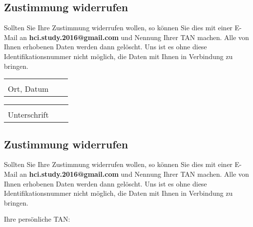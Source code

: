 \documentclass[10pt,a4paper]{scrartcl}
\begin{document}
\subsection*{Zustimmung widerrufen}
Sollten Sie Ihre Zustimmung widerrufen wollen, so können Sie dies mit einer E-Mail an \textbf{hci.study.2016@gmail.com} und Nennung Ihrer TAN machen. Alle von Ihnen erhobenen Daten werden dann gelöscht. Uns ist es ohne diese Identifikationsnummer nicht möglich, die Daten mit Ihnen in Verbindung zu bringen.

\vspace{3 cm} 
\begin{tabular}{p{7cm}p{.5cm}l}
	\dotfill \\ 
	Ort, Datum
\end{tabular}
\hfill 
\begin{tabular}{p{7cm}p{.5cm}l}
	\dotfill \\ 
	Unterschrift
\end{tabular}

\newpage

\maketitle

\subsection*{Zustimmung widerrufen}
Sollten Sie Ihre Zustimmung widerrufen wollen, so können Sie dies mit einer E-Mail an \textbf{hci.study.2016@gmail.com} und Nennung Ihrer TAN machen. Alle von Ihnen erhobenen Daten werden dann gelöscht. Uns ist es ohne diese Identifikationsnummer nicht möglich, die Daten mit Ihnen in Verbindung zu bringen.

\vspace{2 cm}
\noindent
Ihre persönliche TAN: \dotfill\\
\end{document}
